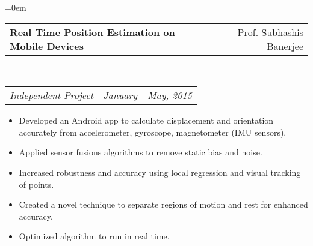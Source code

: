 \documentclass{article}
\makeatletter
\newenvironment{longversion}{}{} %
\newcommand{\headerrow}[2]
{\begin{tabular*}{\linewidth}{l@{\extracolsep{\fill}}r}
	#1 &
	#2 \\
\end{tabular*}}
\makeatother
\begin{document}
\begin{list} {}{\leftmargin=0em}
\item[]
  \headerrow
  {\textbf{Real Time Position Estimation on Mobile Devices}}
  {Prof. Subhashis Banerjee}
  \\
  \headerrow
    {\emph{Independent Project}}
    {\emph{January - May, 2015}}

    \begin{itemize}
      \item Developed an Android app to calculate displacement and orientation accurately from accelerometer, gyroscope, magnetometer (IMU sensors).
      \item Applied sensor fusions algorithms to remove static bias and noise.
      \item Increased robustness and accuracy using local regression and visual tracking of points.
      \item Created a novel technique to separate regions of motion and rest for enhanced accuracy.
      \item Optimized algorithm to run in real time.
    \end{itemize}

\end{list}

\begin{longversion}
\end{longversion}
\end{document}
